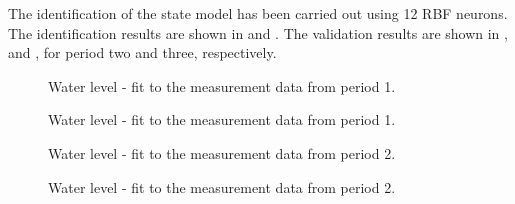  The identification of the state model has been carried out using 12 RBF neurons. The identification results are shown in  and . The validation results are shown in ,  and ,  for period two and three, respectively. 

  \begin{figure}[H]
  \centering
   
  \vspace{-2.5mm}
  \caption{Water level - fit to the measurement data from period 1.}
  \label{fig:fit_w1w2_p1}
  \end{figure}
 \vspace{-3mm}

  \begin{figure}[H]
  \centering
   
  \vspace{-2.5mm}
  \caption{Water level - fit to the measurement data from period 1.}
  \label{fig:fit_w3_p1}
  \end{figure}
 \vspace{-3mm}

  \begin{figure}[H]
  \centering
   
  \vspace{-2.5mm}
  \caption{Water level - fit to the measurement data from period 2.}
  \label{fig:fit_w1w2_p2}
  \end{figure}
 \vspace{-3mm}

  \begin{figure}[H]
  \centering
   
  \vspace{-2.5mm}
  \caption{Water level - fit to the measurement data from period 2.}
  \label{fig:fit_w3_p2}
  \end{figure}
 \vspace{-3mm}

